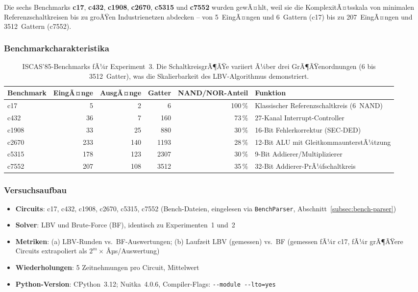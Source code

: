 ﻿\documentclass[a4paper,12pt]{article}
\theoremstyle{definition}
\begin{document}
Die sechs Benchmarks \textbf{c17}, \textbf{c432}, \textbf{c1908},
\textbf{c2670}, \textbf{c5315} und \textbf{c7552} wurden gewÃ¤hlt, weil sie
die KomplexitÃ¤tsskala von minimalen Referenzschaltkreisen bis zu
groÃŸen Industrienetzen abdecken -- von 5~EingÃ¤ngen und 6~Gattern (c17)
bis zu 207~EingÃ¤ngen und 3512~Gattern (c7552).

\subsubsection{Benchmarkcharakteristika}

\begin{table}
  \centering
  \begin{tabular}{lrrrrl}
    \toprule
    \textbf{Benchmark} & \textbf{EingÃ¤nge} & \textbf{AusgÃ¤nge}
      & \textbf{Gatter} & \textbf{NAND/NOR-Anteil} & \textbf{Funktion} \\
    \midrule
    c17   &   5 &  2 &    6 & 100\,\% & Klassischer Referenzschaltkreis (6~NAND) \\
    c432  &  36 &  7 &  160 & ~73\,\% & 27-Kanal Interrupt-Controller \\
    c1908 &  33 & 25 &  880 & ~30\,\% & 16-Bit Fehlerkorrektur (SEC-DED) \\
    c2670 & 233 & 140 & 1193 & ~28\,\% & 12-Bit ALU mit GleitkommaunterstÃ¼tzung \\
    c5315 & 178 & 123 & 2307 & ~30\,\% & 9-Bit Addierer/Multiplizierer \\
    c7552 & 207 & 108 & 3512 & ~35\,\% & 32-Bit Addierer-PrÃ¼fschaltkreis \\
    \bottomrule
  \end{tabular}
  \caption{ISCAS'85-Benchmarks fÃ¼r Experiment~3.  Die SchaltkreisgrÃ¶ÃŸe
           variiert Ã¼ber drei GrÃ¶ÃŸenordnungen (6 bis 3512~Gatter),
           was die Skalierbarkeit des LBV-Algorithmus demonstriert.}
  \label{tab:iscas-benchmarks}
\end{table}

\subsubsection{Versuchsaufbau}

\begin{itemize}
  \item \textbf{Circuits}: c17, c432, c1908, c2670, c5315, c7552 (Bench-Dateien,
    eingelesen via \texttt{BenchParser}, Abschnitt~\ref{subsec:bench-parser})
  \item \textbf{Solver}: LBV und Brute-Force (BF), identisch zu
    Experimenten~1 und~2
  \item \textbf{Metriken}: (a) LBV-Runden vs.\ BF-Auswertungen;
    (b) Laufzeit LBV (gemessen) vs.\ BF (gemessen fÃ¼r c17,
    fÃ¼r grÃ¶ÃŸere Circuits extrapoliert als $2^m \times$\,Âµs/Auswertung)
  \item \textbf{Wiederholungen}: 5 Zeitnehmungen pro Circuit, Mittelwert
  \item \textbf{Python-Version}: CPython~3.12; Nuitka~4.0.6,
    Compiler-Flags: \texttt{-{}-module -{}-lto=yes}
\end{itemize}
\end{document}
